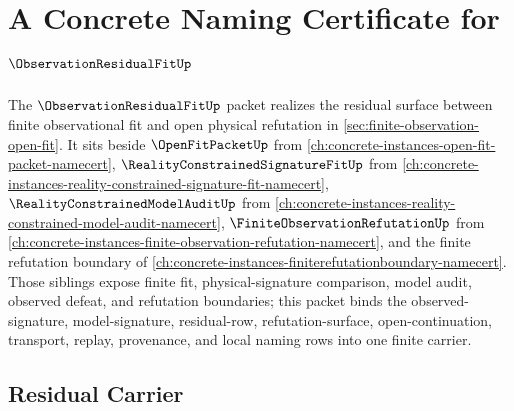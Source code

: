 \chapter{A Concrete Naming Certificate for $\ObservationResidualFitUp$}
\label{ch:concrete-instances-observation-residual-fit-namecert}

The $\ObservationResidualFitUp$ packet realizes the residual surface between finite observational fit and open physical refutation in \autoref{sec:finite-observation-open-fit}. It sits beside $\OpenFitPacketUp$ from \autoref{ch:concrete-instances-open-fit-packet-namecert}, $\RealityConstrainedSignatureFitUp$ from \autoref{ch:concrete-instances-reality-constrained-signature-fit-namecert}, $\RealityConstrainedModelAuditUp$ from \autoref{ch:concrete-instances-reality-constrained-model-audit-namecert}, $\FiniteObservationRefutationUp$ from \autoref{ch:concrete-instances-finite-observation-refutation-namecert}, and the finite refutation boundary of \autoref{ch:concrete-instances-finiterefutationboundary-namecert}. Those siblings expose finite fit, physical-signature comparison, model audit, observed defeat, and refutation boundaries; this packet binds the observed-signature, model-signature, residual-row, refutation-surface, open-continuation, transport, replay, provenance, and local naming rows into one finite carrier.

\section{Residual Carrier}
\label{sec:observation-residual-fit-carrier}

